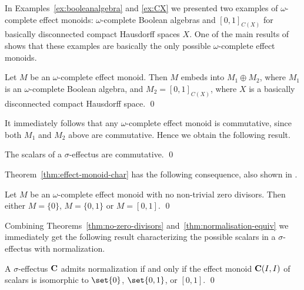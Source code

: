\documentclass[%
	submission,
copyright,creativecommons,UKenglish]{eptcs}
\begin{document}
In Examples~\ref{ex:booleanalgebra} and \ref{ex:CX}
we presented two examples
of $\omega$-complete effect monoids:
$\omega$-complete Boolean algebras
and $[0,1]_{C(X)}$
for basically disconnected compact Hausdorff spaces $X$.
One of the main results of \cite{effectmonoids} shows that
these examples are basically the only possible $\omega$-complete effect monoids.

\begin{theorem}\label{thm:effect-monoid-char}
    Let $M$ be an $\omega$-complete effect monoid.
    Then $M$ embeds into $M_1\oplus M_2$, where
    $M_1$ is an $\omega$-complete Boolean algebra,
    and $M_2 =[0,1]_{C(X)}$,
    where $X$ is a basically disconnected compact Hausdorff space. \qed
\end{theorem}

It immediately
follows that any $\omega$-complete effect monoid is commutative,
since both $M_1$ and $M_2$ above are commutative.
Hence we obtain the following result.

\begin{corollary}
    The scalars of a $\sigma$-effectus are commutative.
    \qed
\end{corollary}

Theorem~\ref{thm:effect-monoid-char}
has the following consequence, also shown in \cite{effectmonoids}.

\begin{theorem}\label{thm:no-zero-divisors}
    Let $M$ be an $\omega$-complete effect monoid with no non-trivial
    zero divisors.
    Then either $M=\{0\}$, $M=\{0,1\}$ or $M=[0,1]$. \qed
\end{theorem}



Combining Theorems~\ref{thm:no-zero-divisors} and~\ref{thm:normalisation-equiv} we immediately get the following result characterizing the possible scalars in a $\sigma$-effectus with normalization.

\begin{theorem}
A $\sigma$-effectus $\mathbf{C}$ admits normalization
if and only if the effect monoid $\mathbf{C}(I,I)$ of scalars is isomorphic
to $\set{0}$, $\set{0,1}$, or $[0,1]$.
\qed
\end{theorem}
\end{document}
